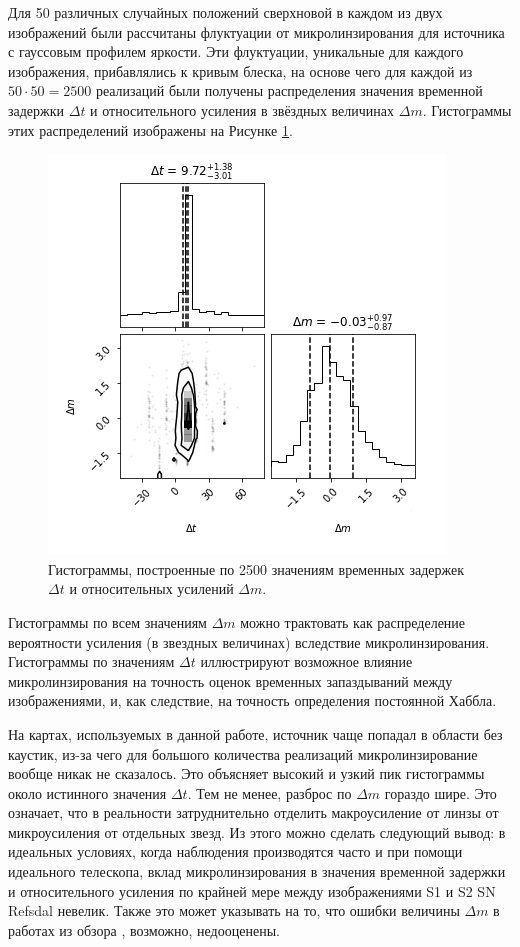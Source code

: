 Для 50 различных случайных положений сверхновой в каждом из двух изображений были рассчитаны флуктуации от микролинзирования для источника с гауссовым профилем яркости. Эти флуктуации, уникальные для каждого изображения, прибавлялись к кривым блеска, на основе чего для каждой из $50 \cdot 50 = 2500$ реализаций были получены распределения значения временной задержки $\Delta t$ и относительного усиления в звёздных величинах $\Delta m$. Гистограммы этих распределений изображены на Рисунке \ref{fig:histograms}.

\begin{figure}[H]
    \centering
	\includegraphics[width=0.6\linewidth]{microlensing/images/histo1.png}
	\caption{Гистограммы, построенные по 2500 значениям временных задержек $\Delta t$ и относительных усилений $\Delta m$.} 
	\label{fig:histograms}
\end{figure}

Гистограммы по всем значениям $\Delta m$ можно трактовать как распределение вероятности усиления (в звездных величинах) вследствие микролинзирования. Гистограммы по значениям $\Delta t$ иллюстрируют возможное влияние микролинзирования на точность оценок временных запаздываний между изображениями, и, как следствие, на точность определения постоянной Хаббла.

На картах, используемых в данной работе, источник чаще попадал в области без каустик, из-за чего для большого количества реализаций микролинзирование вообще никак не сказалось. Это объясняет высокий и узкий пик гистограммы около истинного значения $\Delta t$. Тем не менее, разброс по $\Delta m$ гораздо шире. Это означает, что в реальности затруднительно отделить макроусиление от линзы от микроусиления от отдельных звезд. Из этого можно сделать следующий вывод: в идеальных условиях, когда наблюдения производятся часто и при помощи идеального телескопа, вклад микролинзирования в значения временной задержки и относительного усиления по крайней мере между изображениями S1 и S2 SN Refsdal невелик. Также это может указывать на то, что ошибки величины $\Delta m$ в работах из обзора \cite{treu2016}, возможно, недооценены. %

